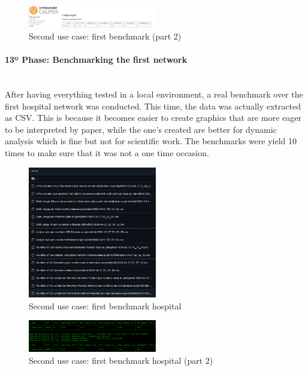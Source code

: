 \begin{figure}[H]
    \centering
    \includegraphics[width=0.5\textwidth]{assets/use-case-2/first-benchmarking2.png} %
    \caption{Second use case: first benchmark (part 2)}
    \label{fig:sample-image} 
\end{figure}

\paragraph{13º Phase: Benchmarking the first network}\mbox{}\\
After having everything tested in a local environment, a real benchmark over the first hospital network was conducted. This time, the data was actually extracted as CSV. This is because it becomes easier to create graphics that are more eager to be interpreted by paper, while the one's created are better for dynamic analysis which is fine but not for scientific work. The benchmarks were yield 10 times to make sure that it was not a one time occasion.
\begin{figure}[H]
    \centering
    \includegraphics[width=0.5\textwidth]{assets/use-case-2/first-benchmarking-hospital.png} %
    \caption{Second use case: first benchmark hospital}
    \label{fig:sample-image} 
\end{figure}

\begin{figure}[H]
    \centering
    \includegraphics[width=0.5\textwidth]{assets/use-case-2/first-benchmarking-hospital2.png} %
    \caption{Second use case: first benchmark hospital (part 2)}
    \label{fig:sample-image} 
\end{figure}

